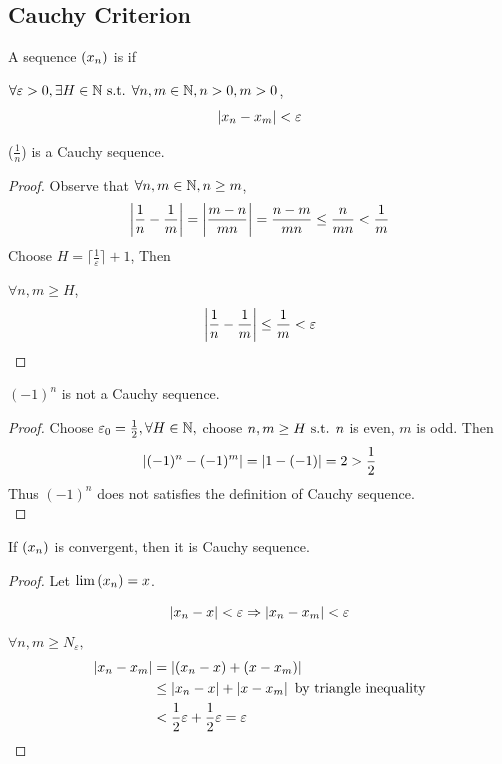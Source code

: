 \documentclass[a4paper,12pt]{article}
\begin{document}
\subsection{Cauchy Criterion}
\begin{definition}
    A sequence \((x_{n})\) is  if 
    
    \(\forall \varepsilon>0, \exists H\in\mathbb{N} \text{ s.t. } \forall n,m\in\mathbb{N}, n>0,m>0\),
    \[\left\lvert x_n-x_m\right\rvert<\varepsilon\]

    \begin{example}(\(\frac{1}{n}\)) is a Cauchy sequence.
        \begin{proof}
            Observe that \(\forall n,m\in\mathbb{N}, n\ge m\),
            \[\left\lvert \frac{1}{n}-\frac{1}{m}\right\rvert=\left\lvert \frac{m-n}{mn}\right\rvert=\frac{n-m}{mn}\le\frac{n}{mn}<\frac{1}{m}\]
            Choose \(H=\lceil \frac{1}{\varepsilon} \rceil+1\), Then

            \(\forall n,m\ge H\),
            \[\left\lvert \frac{1}{n}-\frac{1}{m}\right\rvert\le \frac{1}{m}<\varepsilon\]
        \end{proof}
    \end{example}

    \begin{example}\((-1)^n\) is not a Cauchy sequence.
        \begin{proof}
            Choose \(\varepsilon_0=\frac{1}{2}, \forall H\in\mathbb{N},\) choose \(n,m\ge H \text{ s.t. } n\) is even, \(m\) is odd. Then 
            \[\left\lvert (-1)^n-(-1)^m\right\rvert=\left\lvert 1-(-1)\right\rvert=2>\frac{1}{2}\]
            Thus \((-1)^n\) does not satisfies the definition of Cauchy sequence.\\
        \end{proof}
    \end{example}
\end{definition}

\begin{theorem}
    If \((x_{n})\) is convergent, then it is Cauchy sequence.
    \begin{proof}
        Let \(\lim{(x_{n})}=x\).

         \[\left\lvert x_n-x\right\rvert<\varepsilon\Rightarrow\left\lvert x_n-x_m\right\rvert<\varepsilon\]
        \(\forall n,m\ge N_\varepsilon,\)
        \begin{align*}
            \left\lvert x_n-x_m\right\rvert &= \left\lvert (x_n-x)+(x-x_m)\right\rvert\\
            &\le \left\lvert x_n-x\right\rvert+\left\lvert x-x_m\right\rvert \text{ by triangle inequality}\\
            &<\frac{1}{2}\varepsilon+\frac{1}{2}\varepsilon=\varepsilon
        \end{align*}
    \end{proof}
\end{theorem}
\newpage
\end{document}
